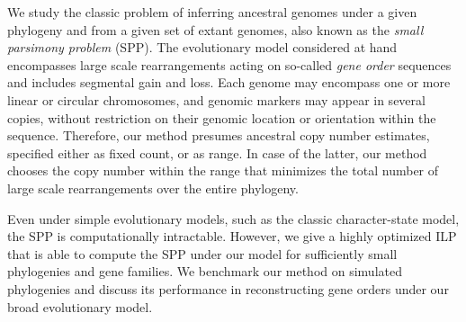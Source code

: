     We study the classic problem of inferring ancestral genomes under a given phylogeny and from a given set of extant genomes, also known as the \emph{small parsimony problem} (SPP).
    The evolutionary model considered at hand encompasses large scale rearrangements acting on so-called \emph{gene order} sequences and includes segmental gain and loss. Each genome may encompass one or more linear or circular chromosomes, and genomic markers may appear in several copies, without restriction on their genomic location or orientation within the sequence.
    Therefore, our method presumes ancestral copy number estimates, specified either as fixed count, or as range. 
    In case of the latter, our method chooses the copy number within the range that minimizes the total number of large scale rearrangements over the entire phylogeny. 
    
Even under simple evolutionary models, such as the classic character-state model, the SPP is computationally intractable.
However, we give a highly optimized ILP that is able to compute the SPP under our model for sufficiently small phylogenies and gene families. We benchmark our method on simulated phylogenies and discuss its performance in reconstructing gene orders under our broad evolutionary model. 

